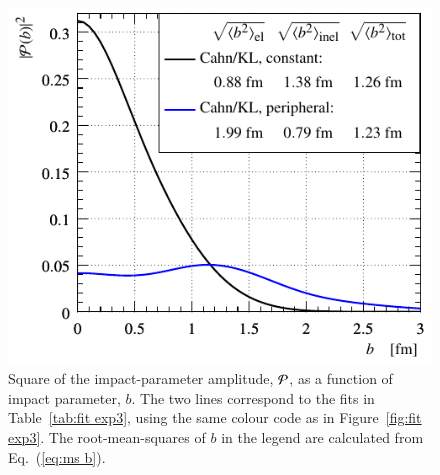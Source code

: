 \begin{figure}
\begin{center}
\includegraphics{fig/fit_exp3/b_dist.pdf}
\caption{%
Square of the impact-parameter amplitude, ${\cal P}$, as a function of impact parameter, $b$. The two lines correspond to the fits in Table~\ref{tab:fit exp3}, using the same colour code as in Figure~\ref{fig:fit exp3}. The root-mean-squares of $b$ in the legend are calculated from Eq.~(\ref{eq:ms b}).
}%
\label{fig:bdist exp3}
\end{center}
\end{figure}
